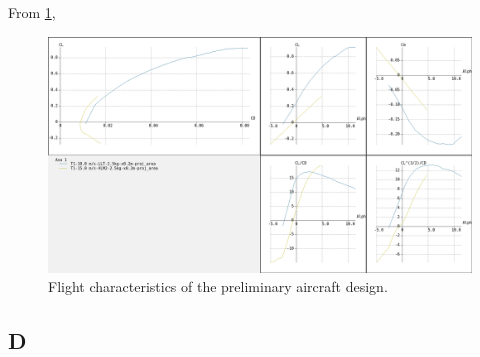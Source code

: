 From \ref{fig:craftpolar}, 	

\begin{figure}
\centering
  \includegraphics[width=\linewidth]{figs/craftpolar.png}
  \caption{Flight characteristics of the preliminary aircraft design.}
  \label{fig:craftpolar}
\end{figure}


\subsection{D}



